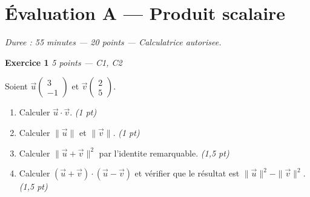 
\section*{Évaluation A — Produit scalaire}

\textit{Duree : 55 minutes — 20 points — Calculatrice autorisee.}

\bigskip

\textbf{Exercice 1} \hfill \textit{5 points — C1, C2}

Soient $\vec{u}\begin{pmatrix} 3 \\ -1 \end{pmatrix}$ et $\vec{v}\begin{pmatrix} 2 \\ 5 \end{pmatrix}$.

\begin{enumerate}
  \item Calculer $\vec{u} \cdot \vec{v}$. \hfill \textit{(1 pt)}
  \item Calculer $\|\vec{u}\|$ et $\|\vec{v}\|$. \hfill \textit{(1 pt)}
  \item Calculer $\|\vec{u} + \vec{v}\|^2$ par l'identite remarquable. \hfill \textit{(1,5 pt)}
  \item Calculer $(\vec{u} + \vec{v}) \cdot (\vec{u} - \vec{v})$ et vérifier que le résultat est $\|\vec{u}\|^2 - \|\vec{v}\|^2$. \hfill \textit{(1,5 pt)}
\end{enumerate}


